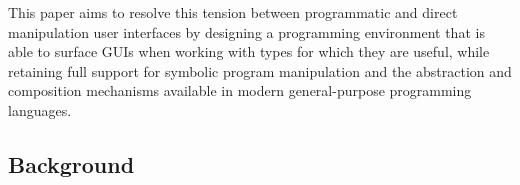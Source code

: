 
This paper aims to resolve this tension between
programmatic and direct manipulation user interfaces by designing 
a programming environment that
is able to surface GUIs when working with types for which
they are useful, while retaining full support for symbolic program manipulation
and the abstraction and composition mechanisms
available in modern general-purpose programming languages.

\subsection{Background}\label{sec:background}

